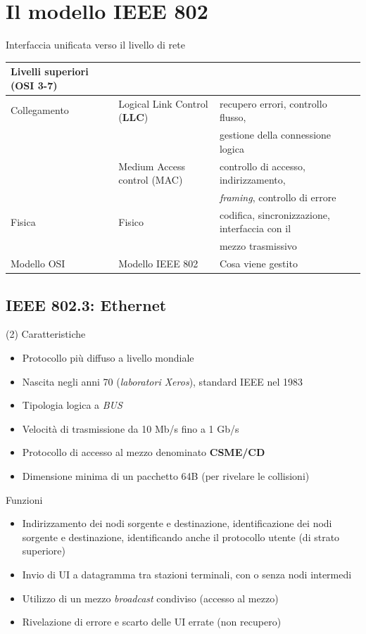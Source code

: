 \documentclass{book}
\begin{document}
\section{Il modello IEEE 802}
Interfaccia unificata verso il livello di rete
\begin{table}[h!]
	\begin{tabular}{|l|l|l|}
		\hline
		Livelli superiori ({\bf OSI 3-7})&&\\\hline
		Collegamento&Logical Link Control ({\bf LLC})&recupero errori,
		controllo flusso,\\
		&&gestione della connessione logica \\
					&Medium Access control (MAC)&controllo di accesso,
					indirizzamento,\\
					&&\textit{framing}, controllo di errore\\\hline
		Fisica&Fisico&codifica, sincronizzazione, interfaccia con il\\
		&&mezzo trasmissivo\\\hline\hline
		Modello OSI&Modello IEEE 802&Cosa viene gestito\\\hline
	\end{tabular}
\end{table}
\subsection{IEEE 802.3: Ethernet}
\begin{tasks}(2)
	\task Caratteristiche
	\begin{itemize}
		\item Protocollo più diffuso a livello mondiale
		\item Nascita negli anni 70 (\textit{laboratori Xeros}), standard IEEE
			nel 1983
		\item Tipologia logica a \textit{BUS}
		\item Velocità di trasmissione da 10 Mb/s fino a 1 Gb/s
		\item Protocollo di accesso al mezzo denominato \textbf{CSME/CD}
		\item Dimensione minima di un pacchetto 64B (per rivelare le collisioni)
	\end{itemize}
	\task Funzioni
	\begin{itemize}
		\item Indirizzamento dei nodi sorgente e destinazione, identificazione
			dei nodi sorgente e destinazione, identificando anche il protocollo
			utente (di strato superiore)
		\item Invio di UI a datagramma tra stazioni terminali, con o senza nodi
			intermedi
		\item Utilizzo di un mezzo \textit{broadcast} condiviso (accesso al
			mezzo)
		\item Rivelazione di errore e scarto delle UI errate (non recupero)
	\end{itemize}
\end{tasks}
\end{document}
